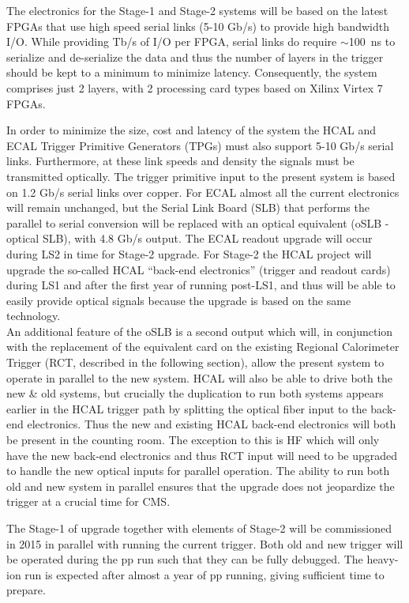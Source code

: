 The electronics for the Stage-1 and Stage-2 systems will be based on the latest FPGAs
that use high speed serial links (5-10
Gb/s) to provide high bandwidth I/O.  While providing Tb/s of I/O per
FPGA, serial links do require $\sim$100~ns to serialize and
de-serialize the data and thus the number of layers in the trigger
should be kept to a minimum to minimize latency. Consequently, the
system comprises just 2 layers, with 2 processing card types based on
Xilinx Virtex 7 FPGAs. 

In order to minimize the size, cost and latency of the system the HCAL 
and ECAL Trigger Primitive Generators (TPGs) must also support 5-10 Gb/s serial links.
Furthermore, at these link speeds and density the signals must be transmitted optically. 
The trigger primitive input to the present system is based on 1.2 Gb/s serial links over copper.  
For ECAL almost all the current electronics will remain unchanged, 
but the Serial Link Board (SLB) that performs
the parallel to serial conversion will be replaced with an optical
equivalent (oSLB - optical SLB), with 4.8 Gb/s output. The ECAL readout upgrade will occur during LS2 in time for Stage-2 upgrade.
For Stage-2 the HCAL project will upgrade the so-called HCAL ``back-end
electronics'' (trigger and readout cards) during LS1 and after the
first year of running post-LS1, and thus will be able to easily
provide optical signals because the upgrade is based on the same
technology.\\

An additional feature of the oSLB is a second output which will, in
conjunction with the replacement of the equivalent card on the
existing Regional Calorimeter Trigger (RCT, described in the following
section), allow the present system to operate in parallel to the
new system. HCAL will also be able to drive both the new \& old
systems, but crucially the duplication to run both systems appears
earlier in the HCAL trigger path by splitting the optical fiber input
to the back-end electronics.
Thus the new and existing HCAL back-end electronics will both be present in the counting room.  The
exception to this is HF which will only have the new back-end
electronics and thus RCT input will need to be upgraded to handle the
new optical inputs for parallel operation. The ability to run both old 
and new system in parallel ensures that the upgrade does not jeopardize 
the trigger at a crucial time for CMS.

The Stage-1 of upgrade together with elements of Stage-2 will be commissioned 
in 2015 in parallel with running the current trigger. 
Both old and new trigger will be operated during the pp run such that they can be fully debugged. 
The heavy-ion run is expected after almost a year of pp running, giving sufficient time
to prepare.

